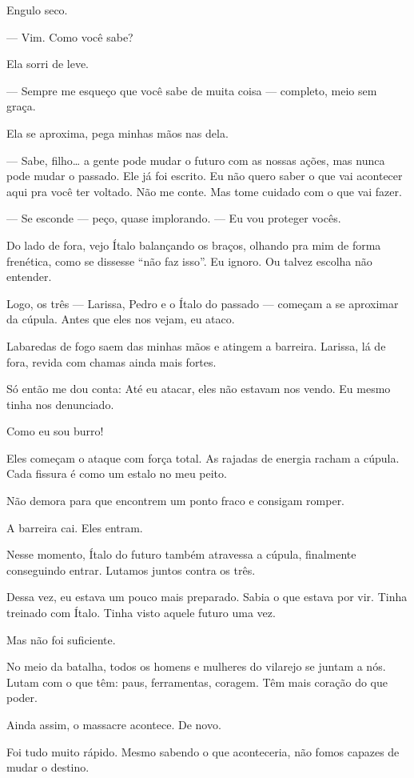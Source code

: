 Engulo seco.

— Vim. Como você sabe?

Ela sorri de leve.

— Sempre me esqueço que você sabe de muita coisa — completo, meio sem graça.

Ela se aproxima, pega minhas mãos nas dela.

— Sabe, filho… a gente pode mudar o futuro com as nossas ações, mas nunca pode mudar o passado. Ele já foi escrito.  
Eu não quero saber o que vai acontecer aqui pra você ter voltado. Não me conte.  
Mas tome cuidado com o que vai fazer.

— Se esconde — peço, quase implorando. — Eu vou proteger vocês.

Do lado de fora, vejo Ítalo balançando os braços, olhando pra mim de forma frenética, como se dissesse “não faz isso”.  
Eu ignoro.  
Ou talvez escolha não entender.

Logo, os três — Larissa, Pedro e o Ítalo do passado — começam a se aproximar da cúpula.  
Antes que eles nos vejam, eu ataco.

Labaredas de fogo saem das minhas mãos e atingem a barreira.  
Larissa, lá de fora, revida com chamas ainda mais fortes.

Só então me dou conta:  
Até eu atacar, eles não estavam nos vendo.  
Eu mesmo tinha nos denunciado.

Como eu sou burro!

Eles começam o ataque com força total.  
As rajadas de energia racham a cúpula.  
Cada fissura é como um estalo no meu peito.

Não demora para que encontrem um ponto fraco e consigam romper.

A barreira cai.  
Eles entram.

Nesse momento, Ítalo do futuro também atravessa a cúpula, finalmente conseguindo entrar.  
Lutamos juntos contra os três.

Dessa vez, eu estava um pouco mais preparado.  
Sabia o que estava por vir.  
Tinha treinado com Ítalo.  
Tinha visto aquele futuro uma vez.

Mas não foi suficiente.

No meio da batalha, todos os homens e mulheres do vilarejo se juntam a nós.  
Lutam com o que têm: paus, ferramentas, coragem.  
Têm mais coração do que poder.

Ainda assim, o massacre acontece.  
De novo.

Foi tudo muito rápido.  
Mesmo sabendo o que aconteceria, não fomos capazes de mudar o destino.

